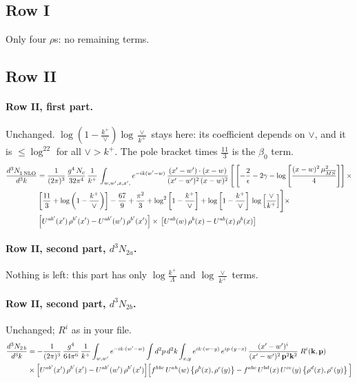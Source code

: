 \documentclass[10pt]{article}
\numberwithin{equation}{section}
\begin{document}
\subsection{Row I}
Only four $\rho$\textquotesingle s: no remaining terms.
\subsection{Row II}
\paragraph{Row II, first part.}
Unchanged. $\log(1-\frac{k^+}{\vee})\log\frac{\vee}{k^+}$ stays here: its coefficient depends on $\vee$, and it is $\le\log^22$ for all $\vee>k^+$. The pole bracket times $\frac{11}{3}$ is the $\beta_0$ term.
\begin{align}
     \frac{d^{3}N_{1\,\rm NLO}^{\rm}}{d^{3}k} &  =  \frac{1}{(2\pi)^{3}}\, \frac{g^{4}\,N_{c}}{32\pi^{4}}\,\frac{1}{k^{+}}\, \int_{w, w',x,x',} e^{-ik(w^\prime-w)}\, \frac{(x'-w')\cdot (x-w)}{(x'-w')^{2}\, (x-w)^{2}}\, \Bigg[\left[-\frac{2}{\epsilon}-2\gamma-\log{\left[\frac{(x-w)^{2}\,\mu^{2}_{\overline{MS}}}{4}\right]}\right]\times \notag \\ & \left[\frac{11}{3}+\log{\left(1-\frac{k^{+}}{\vee}\right)}\right]-\frac{67}{9}+\frac{\pi^{2}}{3}+\log^{2}{\left[1-\frac{k^{+}}{\vee}\right]}+\log{\left[1-\frac{k^{+}}{\vee}\right]}\,\log{\left[\frac{\vee}{k^{+}}\right]}\Bigg]\times\notag \\ & \left[U^{ab'}(x')\,\rho^{b'}(x') - U^{ab'}(w')\,\rho^{b'}(x')\right]\times\,\left[U^{ab}(w)\,\rho^{b}(x) - U^{ab}(x)\,\rho^{b}(x)\right] \label{eq:F:G1II1}
\end{align}

\paragraph{Row II, second part, $d^3N_{2a}$.}
Nothing is left: this part has only $\log\frac{k^+}{\Lambda}$ and $\log\frac{\vee}{k^+}$ terms.
\paragraph{Row II, second part, $d^3N_{2b}$.}
Unchanged; $R^i$ as in your file.
\begin{align}
\frac{d^{3}N_{2\,b}}{d^{3}k} & =  -\frac{1}{(2\pi)^{3}}\,\frac{g^{4}}{64\pi^{6}}\,\frac{1}{k^{+}}\int_{w,w'} e^{-ik\cdot(w'-w)}
\int d^{2}p\,d^{2}k\int_{x,y} e^{ik\cdot(w-y)}\,e^{ip\cdot(y-x)}\,\frac{(x'-w')^{i}}{(x'-w')^{2}\,\mathbf{p}^{2}\mathbf{k}^{2}}\;R^{i}(\mathbf{k},\mathbf{p})\notag\\
&\times\Big[U^{ab'}(x')\,\rho^{b'}(x')-U^{ab'}(w')\,\rho^{b'}(x')\Big]
\Big[f^{hbc}\,U^{ah}(w)\left\{\rho^{b}(x),\rho^{c}(y)\right\}-f^{abc}\,U^{bd}(x)\,U^{ce}(y)\left\{\rho^{d}(x),\rho^{e}(y)\right\}\Big] \label{eq:F:G1II2b}
\end{align}
\end{document}
